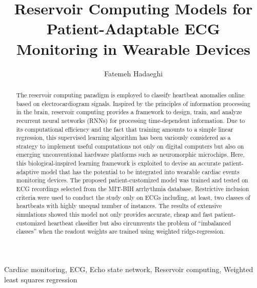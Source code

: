 \documentclass[review]{elsarticle}
\begin{document}
\begin{frontmatter}

\title{Reservoir Computing Models for Patient-Adaptable ECG Monitoring in Wearable Devices}


\author[add1,add2]{\small Fatemeh Hadaeghi}
\address[add1]{\footnotesize Institute of Computational Neuroscience, University Medical Center Hamburg-Eppendorf (UKE), 20251 Hamburg, Germany}
\address[add2]{\footnotesize Department of Electrical Engineering and Computer Science, Jacobs University gGmbH, Bremen, 28759 Bremen, Germany}


\begin{abstract}
The reservoir computing paradigm is employed to classify heartbeat anomalies online based on electrocardiogram signals. Inspired by the principles of information processing in the brain, reservoir computing provides a framework to design, train, and analyze recurrent neural networks (RNNs) for processing time-dependent information.
Due to its computational efficiency and the fact that
training amounts to a simple linear regression, this supervised
learning algorithm has been variously considered as
a strategy to implement useful computations not only on
digital computers but also on emerging unconventional hardware
platforms such as neuromorphic microchips. Here, this
biological-inspired learning framework is exploited to devise
an accurate patient-adaptive model that has the potential
to be integrated into wearable cardiac events monitoring
devices. The proposed patient-customized model was trained
and tested on ECG recordings selected from the MIT-BIH
arrhythmia database. Restrictive inclusion criteria were
used to conduct the study only on ECGs including, at least,
two classes of heartbeats with highly unequal number of
instances. The results of extensive simulations showed this
model not only provides accurate, cheap and fast patient-customized
heartbeat classifier but also circumvents the
problem of “imbalanced classes” when the readout weights
are trained using weighted ridge-regression.
\end{abstract}

\begin{keyword}
Cardiac monitoring, ECG, Echo state network, Reservoir computing, Weighted least squares regression
\end{keyword}

\end{frontmatter}
\end{document}
